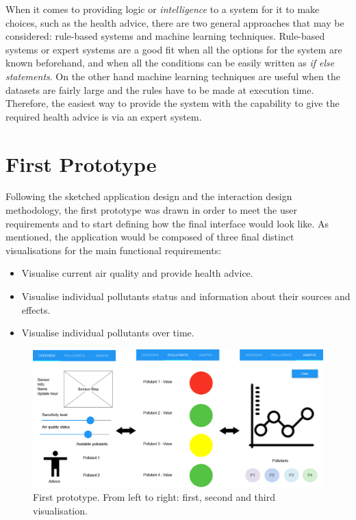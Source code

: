 When it comes to providing logic or \textit{intelligence} to a system for it to make choices, such as the health advice, there are two general approaches that may be considered: rule-based systems and machine learning techniques. Rule-based systems or expert systems are a good fit when all the options for the system are known beforehand, and when all the conditions can be easily written as \textit{if else statements}. On the other hand machine learning techniques are useful when the datasets are fairly large and the rules have to be made at execution time. Therefore, the easiest way to provide the system with the capability to give the required health advice is via an expert system.

\section{First Prototype}
Following the sketched application design and the interaction design methodology, the first prototype was drawn in order to meet the user requirements and to start defining how the final interface would look like. As mentioned, the application would be composed of three final distinct visualisations for the main functional requirements:

\begin{itemize}
    \item Visualise current air quality and provide health advice.
    \item Visualise individual pollutants status and information about their sources and effects.
    \item Visualise individual pollutants over time.
\end{itemize}


\begin{figure}[H]
\begin{adjustbox}{width=1.2\textwidth,center=\textwidth}
  \centering
  \includegraphics[scale=1]{images/firstPrototype.png}
\end{adjustbox}
  \caption[Frist prototype]{First prototype. From left to right: first, second and third visualisation.}
  \label{fig:first_visualization_first_prototype}
\end{figure}


